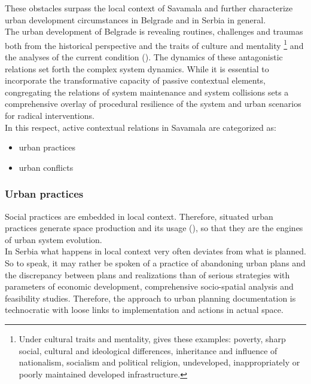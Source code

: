 \documentclass[11pt]{report}
\begin{document}
These obstacles surpass the local context of Savamala and further characterize urban development circumstances in Belgrade and in Serbia in general.
\\

The  urban  development  of  Belgrade  is  revealing  routines, challenges  and  traumas both from the historical perspective and the traits of culture and mentality
\footnote{Under cultural traits and mentality, \href{Samardzic}{\cite{doytchinov_belgrade_2015}} gives these examples: poverty, sharp social, cultural and ideological differences, inheritance and influence of nationalism, socialism and political religion, undeveloped, inappropriately or poorly maintained developed infrastructure.}
and the analyses of the current condition (\href{ref}{\citealt{doytchinov_belgrade_2015}}). 
The dynamics of these antagonistic relations set forth the complex system dynamics.
While it is essential to incorporate the transformative capacity of passive contextual elements, congregating the relations of system maintenance and system collisions sets a comprehensive overlay of procedural resilience of the system and urban scenarios for radical interventions.
\\

In this respect, active contextual relations in Savamala are categorized as:

\begin{itemize}
\item urban practices
\item urban conflicts
\end{itemize}

\subsubsection{Urban practices}

Social practices are embedded in local context. Therefore, situated urban practices generate space production and its usage (\href{ref}{\citealt{de_holanda_exceptional_2011}}), so that they are the engines of urban system evolution. %
\\

In Serbia what happens in local context very often deviates from what is planned. So to speak, it may rather be spoken of a practice of abandoning urban plans and the discrepancy between plans and realizations than of serious strategies with parameters of economic development, comprehensive socio-spatial analysis and feasibility studies.
Therefore, the approach to urban planning documentation is technocratic with loose links to implementation and actions in actual space.
\\
\end{document}

